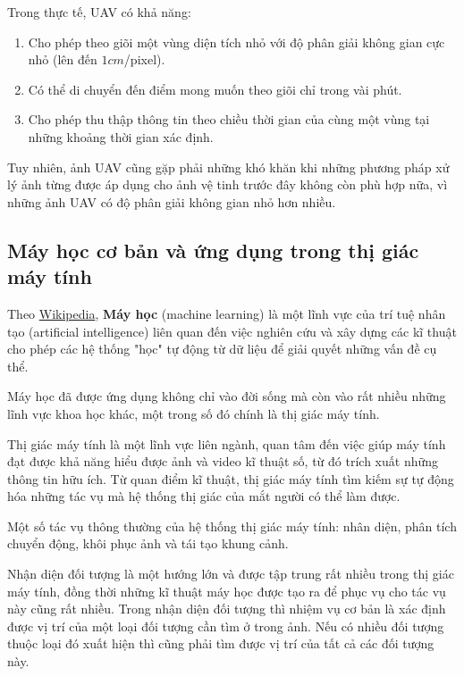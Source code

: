 \documentclass[14pt, oneside, a4paper, openany]{scrartcl}
\begin{document}
Trong thực tế, UAV có khả năng:
\begin{enumerate}
	\item Cho phép theo giõi một vùng diện tích nhỏ với độ phân giải không gian cực nhỏ (lên đến $1cm$/pixel).
	\item Có thể di chuyển đến điểm mong muốn theo giõi chỉ trong vài phút.
	\item Cho phép thu thập thông tin theo chiều thời gian của cùng một vùng tại những khoảng thời gian xác định.
\end{enumerate}

Tuy nhiên, ảnh UAV cũng gặp phải những khó khăn khi những phương pháp xử lý ảnh từng được áp dụng cho ảnh vệ tinh trước đây không còn phù hợp nữa, vì những ảnh UAV có độ phân giải không gian nhỏ hơn nhiều.

\subsection{Máy học cơ bản và ứng dụng trong thị giác máy tính}
Theo \href{https://vi.wikipedia.org/wiki/H\%E1\%BB\%8Dc_m\%C3\%A1y}{Wikipedia}, \textbf{Máy học}  (machine learning) là một lĩnh vực của trí tuệ nhân tạo (artificial intelligence) liên quan đến việc nghiên cứu và xây dựng các kĩ thuật cho phép các hệ thống "học" tự động từ dữ liệu để giải quyết những vấn đề cụ thể.

Máy học đã được ứng dụng không chỉ vào đời sống mà còn vào rất nhiều những lĩnh vực khoa học khác, một trong số đó chính là thị giác máy tính.

Thị giác máy tính là một lĩnh vực liên ngành, quan tâm đến việc giúp máy tính đạt được khả năng hiểu được ảnh và video kĩ thuật số, từ đó trích xuất những thông tin hữu ích. Từ quan điểm kĩ thuật, thị giác máy tính tìm kiếm sự tự động hóa những tác vụ mà hệ thống thị giác của mắt người có thể làm được.

Một số tác vụ thông thường của hệ thống thị giác máy tính: nhân diện, phân tích chuyển động, khôi phục ảnh và tái tạo khung cảnh.

Nhận diện đối tượng là một hướng lớn và được tập trung rất nhiều trong thị giác máy tính, đồng thời những kĩ thuật máy học được tạo ra để phục vụ cho tác vụ này cũng rất nhiều. Trong nhận diện đối tượng thì nhiệm vụ cơ bản là xác định được vị trí của một loại đối tượng cần tìm ở trong ảnh. Nếu có nhiều đối tượng thuộc loại đó xuất hiện thì cũng phải tìm được vị trí của tất cả các đối tượng này.
\end{document}
